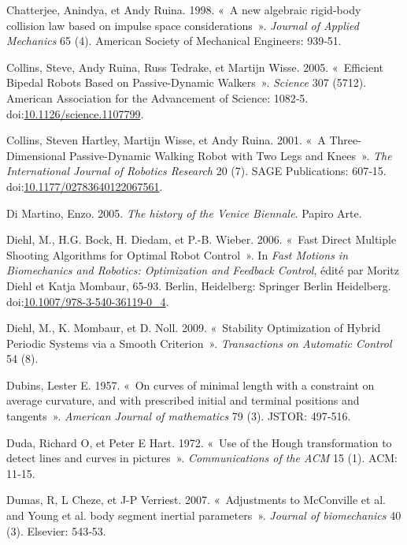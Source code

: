 \documentclass[french,A4paper,]{book}
\begin{document}
\hypertarget{ref-chatterjee98}{}
Chatterjee, Anindya, et Andy Ruina. 1998. «~A new algebraic rigid-body
collision law based on impulse space considerations~». \emph{Journal of
Applied Mechanics} 65 (4). American Society of Mechanical Engineers:
939‑51.

\hypertarget{ref-collins05}{}
Collins, Steve, Andy Ruina, Russ Tedrake, et Martijn Wisse. 2005.
«~Efficient Bipedal Robots Based on Passive-Dynamic Walkers~».
\emph{Science} 307 (5712). American Association for the Advancement of
Science: 1082‑5.
doi:\href{https://doi.org/10.1126/science.1107799}{10.1126/science.1107799}.

\hypertarget{ref-collins01}{}
Collins, Steven Hartley, Martijn Wisse, et Andy Ruina. 2001. «~A
Three-Dimensional Passive-Dynamic Walking Robot with Two Legs and
Knees~». \emph{The International Journal of Robotics Research} 20 (7).
SAGE Publications: 607‑15.
doi:\href{https://doi.org/10.1177/02783640122067561}{10.1177/02783640122067561}.

\hypertarget{ref-DiMartino}{}
Di Martino, Enzo. 2005. \emph{The history of the Venice Biennale}.
Papiro Arte.

\hypertarget{ref-FastMS}{}
Diehl, M., H.G. Bock, H. Diedam, et P.-B. Wieber. 2006. «~Fast Direct
Multiple Shooting Algorithms for Optimal Robot Control~». In \emph{Fast
Motions in Biomechanics and Robotics: Optimization and Feedback
Control}, édité par Moritz Diehl et Katja Mombaur, 65‑93. Berlin,
Heidelberg: Springer Berlin Heidelberg.
doi:\href{https://doi.org/10.1007/978-3-540-36119-0_4}{10.1007/978-3-540-36119-0\_4}.

\hypertarget{ref-diehl09}{}
Diehl, M., K. Mombaur, et D. Noll. 2009. «~Stability Optimization of
Hybrid Periodic Systems via a Smooth Criterion~». \emph{Transactions on
Automatic Control} 54 (8).

\hypertarget{ref-dubins}{}
Dubins, Lester E. 1957. «~On curves of minimal length with a constraint
on average curvature, and with prescribed initial and terminal positions
and tangents~». \emph{American Journal of mathematics} 79 (3). JSTOR:
497‑516.

\hypertarget{ref-hough}{}
Duda, Richard O, et Peter E Hart. 1972. «~Use of the Hough
transformation to detect lines and curves in pictures~».
\emph{Communications of the ACM} 15 (1). ACM: 11‑15.

\hypertarget{ref-dumas07}{}
Dumas, R, L Cheze, et J-P Verriest. 2007. «~Adjustments to McConville et
al. and Young et al. body segment inertial parameters~». \emph{Journal
of biomechanics} 40 (3). Elsevier: 543‑53.
\end{document}
